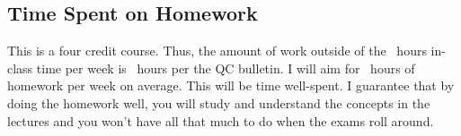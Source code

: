 \subsection*{Time Spent on Homework}

This is a four credit course. Thus, the amount of work outside of the \numcredits~hours in-class time per week is \numhrshwsrange~hours per the QC bulletin. I will aim for \numhrshwtarget~hours of homework per week on average. This will be time well-spent. I guarantee that by doing the homework well, you will study and understand the concepts in the lectures and you won't have all that much to do when the exams roll around.